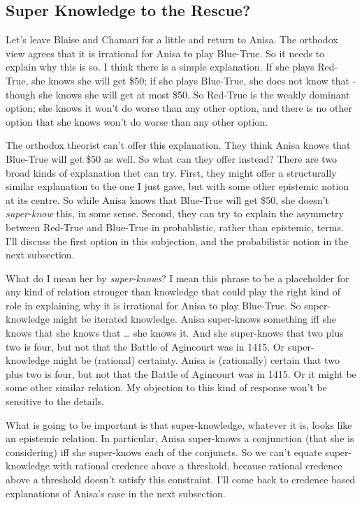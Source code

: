 \documentclass[11pt,]{book}
\begin{document}
\hypertarget{superknow}{%
\subsection{Super Knowledge to the Rescue?}\label{superknow}}

Let's leave Blaise and Chamari for a little and return to Anisa. The orthodox view agrees that it is irrational for Anisa to play Blue-True. So it needs to explain why this is so. I think there is a simple explanation. If she plays Red-True, she knows she will get \$50; if she plays Blue-True, she does not know that - though she knows she will get at most \$50. So Red-True is the weakly dominant option; she knows it won't do worse than any other option, and there is no other option that she knows won't do worse than any other option.

The orthodox theorist can't offer this explanation. They think Anisa knows that Blue-True will get \$50 as well. So what can they offer instead? There are two broad kinds of explanation thet can try. First, they might offer a structurally similar explanation to the one I just gave, but with some other epistemic notion at its centre. So while Anisa knows that Blue-True will get \$50, she doesn't \emph{super-know} this, in some sense. Second, they can try to explain the asymmetry between Red-True and Blue-True in probablistic, rather than epistemic, terms. I'll discuss the first option in this subjection, and the probabilistic notion in the next subsection.

What do I mean her by \emph{super-knows}? I mean this phrase to be a placeholder for any kind of relation stronger than knowledge that could play the right kind of role in explaining why it is irrational for Anisa to play Blue-True. So super-knowledge might be iterated knowledge. Anisa super-knows something iff she knows that she knows that \ldots{} she knows it. And she super-knows that two plus two is four, but not that the Battle of Agincourt was in 1415. Or super-knowledge might be (rational) certainty. Anisa is (rationally) certain that two plus two is four, but not that the Battle of Agincourt was in 1415. Or it might be some other similar relation. My objection to this kind of response won't be sensitive to the details.

What is going to be important is that super-knowledge, whatever it is, looks like an epistemic relation. In particular, Anisa super-knows a conjunction (that she is considering) iff she super-knows each of the conjuncts. So we can't equate super-knowledge with rational credence above a threshold, because rational credence above a threshold doesn't satisfy this constraint. I'll come back to credence based explanations of Anisa's case in the next subsection.
\end{document}
